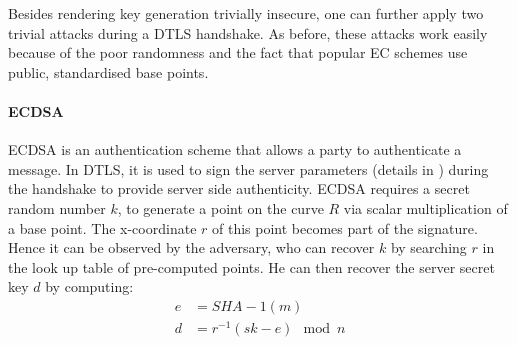 % 
Besides rendering key generation trivially insecure, one can further apply two trivial attacks  during a DTLS handshake. As before, these attacks work easily because of the poor randomness and the fact that popular EC schemes use public, standardised base points.

\paragraph{\textbf{ECDSA}}
	ECDSA\cite{ECDSA} is an authentication scheme that allows a party to authenticate a message. In DTLS, it is used to sign the server parameters (details in \cite{rfc3279}) during the handshake to provide server side authenticity. ECDSA requires a secret random number $k$, to generate a point on the curve $R$ via scalar multiplication of a base point. The x-coordinate $r$ of this point becomes part of the signature. Hence it can be observed by the adversary, who can recover $k$ by searching $r$ in the look up table of pre-computed points. He can then recover the server secret key $d$ by computing:
	\begin{equation}
		\begin{aligned}
		e &= SHA-1(m) \\
		d &= r^{-1}(sk - e) \mod n
		\end{aligned}
	\end{equation}
	
	
